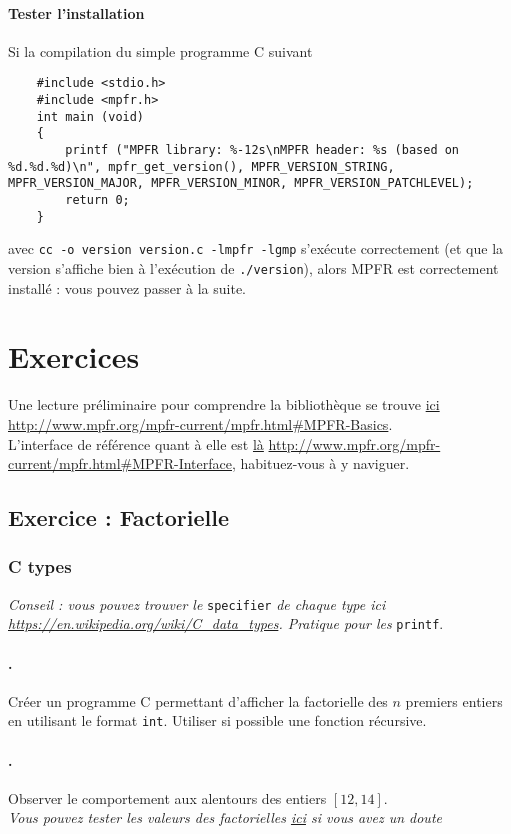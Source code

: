 \documentclass[a4paper,11pt]{exam}
\begin{document}
\paragraph{Tester l'installation}
Si la compilation du simple programme C suivant
\begin{lstlisting}
	#include <stdio.h>
	#include <mpfr.h>
	int main (void)
	{
		printf ("MPFR library: %-12s\nMPFR header: %s (based on %d.%d.%d)\n", mpfr_get_version(), MPFR_VERSION_STRING, MPFR_VERSION_MAJOR, MPFR_VERSION_MINOR, MPFR_VERSION_PATCHLEVEL);
		return 0;
	}
\end{lstlisting}
avec \verb=cc -o version version.c -lmpfr -lgmp= s'exécute correctement (et que la version s'affiche bien à l'exécution de \verb=./version=), alors MPFR est correctement installé : vous pouvez passer à la suite.

\section{Exercices}
Une lecture préliminaire pour comprendre la bibliothèque se trouve \href{http://www.mpfr.org/mpfr-current/mpfr.html#MPFR-Basics}{ici} \url{http://www.mpfr.org/mpfr-current/mpfr.html#MPFR-Basics}.\\
L'interface de référence quant à elle est \href{http://www.mpfr.org/mpfr-current/mpfr.html#MPFR-Interface}{là} \url{http://www.mpfr.org/mpfr-current/mpfr.html#MPFR-Interface}, habituez-vous à y naviguer.

\setcounter{enumi}{1}
\subsection{Exercice \theenumi : Factorielle}
\subsubsection{C types}
\emph{Conseil : vous pouvez trouver le }\verb=specifier= \emph{de chaque type ici \url{https://en.wikipedia.org/wiki/C_data_types}. Pratique pour les} \verb=printf=.
\setcounter{enumii}{1}
\paragraph{\theenumii.} 
Créer un programme C permettant d'afficher la factorielle des $n$ premiers entiers en utilisant le format \verb=int=. Utiliser si possible une fonction récursive. 
\paragraph{\theenumii.} 
Observer le comportement aux alentours des entiers $[12, 14]$. \\
\emph{Vous pouvez tester les valeurs des factorielles \href{https://fr.numberempire.com/factorialcalculator.php}{ici} si vous avez un doute}
\end{document}
